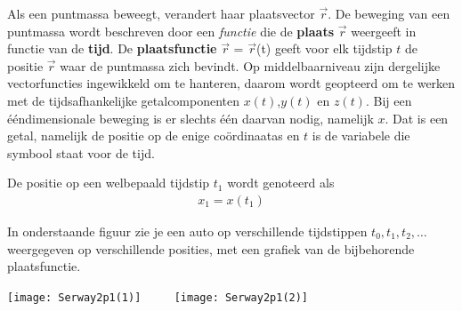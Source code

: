 \documentclass{ximera}
\begin{document}
Als een puntmassa beweegt, verandert haar plaatsvector \(\vec{r}\).  
De beweging van een puntmassa wordt beschreven door een \textit{functie} die de \textbf{plaats} \(\vec{r}\) weergeeft in functie van de \textbf{tijd}. 
De \textbf{plaatsfunctie} \(\vec{r}\) = \(\vec{r}\)(t) geeft voor elk tijdstip \(t\) de positie \(\vec{r}\) waar de puntmassa zich bevindt. 
Op middelbaarniveau zijn dergelijke vectorfuncties ingewikkeld om te hanteren, daarom wordt geopteerd om te werken met de tijdsafhankelijke getalcomponenten \(x(t)\),\(y(t)\) en \(z(t)\).
Bij een ééndimensionale beweging is er slechts één daarvan nodig, namelijk \(x\). Dat is een getal, namelijk de positie op de enige coördinaatas
en $t$ is de variabele die symbool staat voor de tijd.


De positie op een welbepaald tijdstip $t_1$ wordt genoteerd als 
\begin{eqnarray*}
x_1=x(t_1)
\end{eqnarray*}

In onderstaande figuur zie je een auto op verschillende tijdstippen $t_0,t_1, t_2,\ldots$ weergegeven op verschillende posities, met een grafiek van de bijbehorende plaatsfunctie.

\begin{image}
\texttt{[image: Serway2p1(1)]}
$\qquad$   %
\texttt{[image: Serway2p1(2)]}
\end{image}
\end{document}
